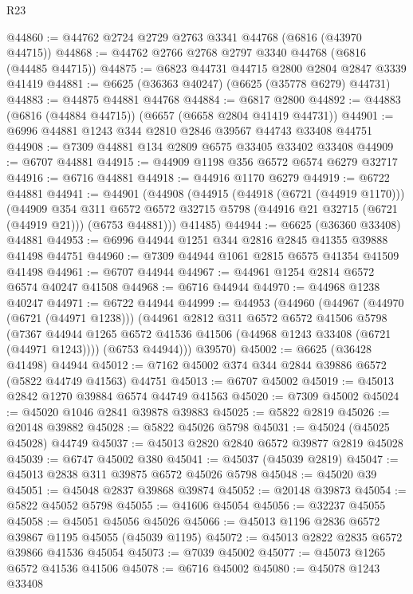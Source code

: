 \begin{lexlean}{R23}
\begin{coremodule}
@44860 := @44762 @2724 @2729 @2763 @3341 @44768 (@6816 (@43970 @44715))
@44868 := @44762 @2766 @2768 @2797 @3340 @44768 (@6816 (@44485 @44715))
@44875 := @6823 @44731 @44715 @2800 @2804 @2847 @3339 @41419
@44881 := @6625 (@36363 @40247) (@6625 (@35778 @6279) @44731)
@44883 := @44875 @44881 @44768
@44884 := @6817 @2800
@44892 := @44883 (@6816 (@44884 @44715)) (@6657 (@6658 @2804 @41419 @44731))
@44901 := @6996 @44881 @1243 @344 @2810 @2846 @39567 @44743 @33408 @44751
@44908 := @7309 @44881 @134 @2809 @6575 @33405 @33402 @33408
@44909 := @6707 @44881
@44915 := @44909 @1198 @356 @6572 @6574 @6279 @32717
@44916 := @6716 @44881
@44918 := @44916 @1170 @6279
@44919 := @6722 @44881
@44941 := @44901
    (@44908
      (@44915
        (@44918 (@6721 (@44919 @1170)))
        (@44909
          @354
          @311
          @6572
          @6572
          @32715
          @5798
          (@44916 @21 @32715 (@6721 (@44919 @21)))
          (@6753 @44881)))
      @41485)
@44944 := @6625 (@36360 @33408) @44881
@44953 := @6996 @44944 @1251 @344 @2816 @2845 @41355 @39888 @41498 @44751
@44960 := @7309 @44944 @1061 @2815 @6575 @41354 @41509 @41498
@44961 := @6707 @44944
@44967 := @44961 @1254 @2814 @6572 @6574 @40247 @41508
@44968 := @6716 @44944
@44970 := @44968 @1238 @40247
@44971 := @6722 @44944
@44999 := @44953
    (@44960
      (@44967
        (@44970 (@6721 (@44971 @1238)))
        (@44961
          @2812
          @311
          @6572
          @6572
          @41506
          @5798
          (@7367 @44944 @1265 @6572 @41536 @41506 (@44968 @1243 @33408 (@6721 (@44971 @1243))))
          (@6753 @44944)))
      @39570)
@45002 := @6625 (@36428 @41498) @44944
@45012 := @7162 @45002 @374 @344 @2844 @39886 @6572 (@5822 @44749 @41563) @44751
@45013 := @6707 @45002
@45019 := @45013 @2842 @1270 @39884 @6574 @44749 @41563
@45020 := @7309 @45002
@45024 := @45020 @1046 @2841 @39878 @39883
@45025 := @5822 @2819
@45026 := @20148 @39882
@45028 := @5822 @45026 @5798
@45031 := @45024 (@45025 @45028) @44749
@45037 := @45013 @2820 @2840 @6572 @39877 @2819 @45028
@45039 := @6747 @45002 @380
@45041 := @45037 (@45039 @2819)
@45047 := @45013 @2838 @311 @39875 @6572 @45026 @5798
@45048 := @45020 @39
@45051 := @45048 @2837 @39868 @39874
@45052 := @20148 @39873
@45054 := @5822 @45052 @5798
@45055 := @41606 @45054
@45056 := @32237 @45055
@45058 := @45051 @45056 @45026
@45066 := @45013 @1196 @2836 @6572 @39867 @1195 @45055 (@45039 @1195)
@45072 := @45013 @2822 @2835 @6572 @39866 @41536 @45054
@45073 := @7039 @45002
@45077 := @45073 @1265 @6572 @41536 @41506
@45078 := @6716 @45002
@45080 := @45078 @1243 @33408

\end{coremodule}
\end{lexlean}
